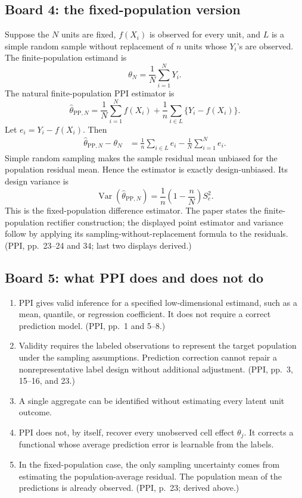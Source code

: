 \documentclass[11pt]{article}
\newcommand{\Var}{\operatorname{Var}}
\begin{document}
  \subsection*{Board 4: the fixed-population version}
  
  Suppose the \(N\) units are fixed, \(f(X_i)\) is observed for every unit, and
  \(L\) is a simple random sample without replacement of \(n\) units
  whose \(Y_i\)'s are observed. The finite-population estimand is
  \[
      \theta_N=\frac{1}{N}\sum_{i=1}^NY_i.
  \]
  The natural finite-population PPI estimator is
  \[
      \widehat\theta_{\mathrm{PP},N}
      =
      \frac{1}{N}\sum_{i=1}^Nf(X_i)
      +
      \frac{1}{n}\sum_{i\in L}\{Y_i-f(X_i)\}.
  \]
  Let \(e_i=Y_i-f(X_i)\). Then
  \begin{align*}
      \widehat\theta_{\mathrm{PP},N}-\theta_N
      &=
      \frac{1}{n}\sum_{i\in L}e_i
      -
      \frac{1}{N}\sum_{i=1}^Ne_i.
  \end{align*}
  Simple random sampling makes the sample residual mean unbiased for the
  population residual mean. Hence the estimator is exactly design-unbiased.
  Its design variance is
  \[
      \Var(\widehat\theta_{\mathrm{PP},N})
      =
      \frac{1}{n}\left(1-\frac{n}{N}\right)S_e^2.
  \]
  This is the fixed-population difference estimator. The paper states the
  finite-population rectifier construction; the displayed point estimator and
  variance follow by applying its sampling-without-replacement formula to the
  residuals. (PPI, pp.~23--24 and 34; last two displays derived.)
  
  \subsection*{Board 5: what PPI does and does not do}
  
  \begin{enumerate}[leftmargin=2em]
      \item PPI gives valid inference for a specified low-dimensional estimand,
      such as a mean, quantile, or regression coefficient. It does not require a
      correct prediction model. (PPI, pp.~1 and 5--8.)
      \item Validity requires the labeled observations to represent the target
      population under the sampling assumptions. Prediction correction cannot
      repair a nonrepresentative label design without additional adjustment.
      (PPI, pp.~3, 15--16, and 23.)
      \item A single aggregate can be identified without estimating every
      latent unit outcome.
      \item PPI does not, by itself, recover every unobserved cell effect
      \(\theta_j\). It corrects a functional whose average prediction error is
      learnable from the labels.
      \item In the fixed-population case, the only sampling uncertainty comes
      from estimating the population-average residual. The population mean of
      the predictions is already observed. (PPI, p.~23; derived above.)
  \end{enumerate}
  
\end{document}
